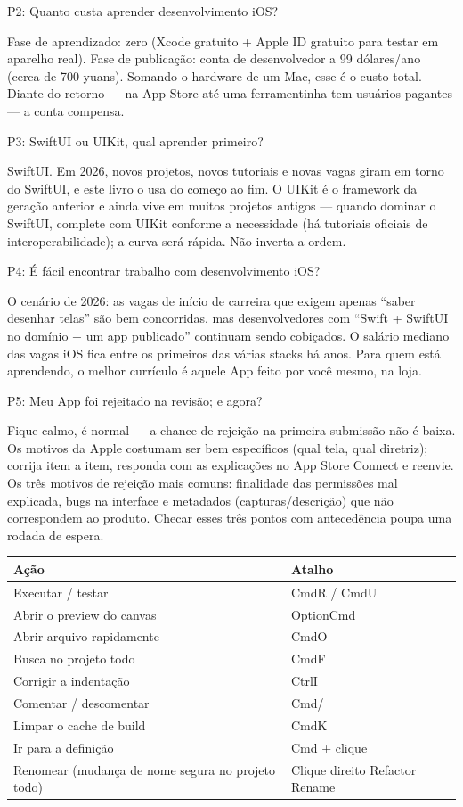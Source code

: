 P2: Quanto custa aprender desenvolvimento iOS?

Fase de aprendizado: zero (Xcode gratuito + Apple ID gratuito para testar em aparelho real). Fase de publicação: conta de desenvolvedor a 99 dólares/ano (cerca de 700 yuans). Somando o hardware de um Mac, esse é o custo total. Diante do retorno — na App Store até uma ferramentinha tem usuários pagantes — a conta compensa.

P3: SwiftUI ou UIKit, qual aprender primeiro?

SwiftUI. Em 2026, novos projetos, novos tutoriais e novas vagas giram em torno do SwiftUI, e este livro o usa do começo ao fim. O UIKit é o framework da geração anterior e ainda vive em muitos projetos antigos — quando dominar o SwiftUI, complete com UIKit conforme a necessidade (há tutoriais oficiais de interoperabilidade); a curva será rápida. Não inverta a ordem.

P4: É fácil encontrar trabalho com desenvolvimento iOS?

O cenário de 2026: as vagas de início de carreira que exigem apenas “saber desenhar telas” são bem concorridas, mas desenvolvedores com “Swift + SwiftUI no domínio + um app publicado” continuam sendo cobiçados. O salário mediano das vagas iOS fica entre os primeiros das várias stacks há anos. Para quem está aprendendo, o melhor currículo é aquele App feito por você mesmo, na loja.

P5: Meu App foi rejeitado na revisão; e agora?

Fique calmo, é normal — a chance de rejeição na primeira submissão não é baixa. Os motivos da Apple costumam ser bem específicos (qual tela, qual diretriz); corrija item a item, responda com as explicações no App Store Connect e reenvie. Os três motivos de rejeição mais comuns: finalidade das permissões mal explicada, bugs na interface e metadados (capturas/descrição) que não correspondem ao produto. Checar esses três pontos com antecedência poupa uma rodada de espera.


\begin{center}
\begin{tabularx}{\linewidth}{|X|X|}
\hline
\textbf{Ação} & \textbf{Atalho} \tabularnewline
\hline
Executar / testar & CmdR / CmdU \tabularnewline
Abrir o preview do canvas & OptionCmd \tabularnewline
Abrir arquivo rapidamente & CmdO \tabularnewline
Busca no projeto todo & CmdF \tabularnewline
Corrigir a indentação & CtrlI \tabularnewline
Comentar / descomentar & Cmd/ \tabularnewline
Limpar o cache de build & CmdK \tabularnewline
Ir para a definição & Cmd + clique \tabularnewline
Renomear (mudança de nome segura no projeto todo) & Clique direito Refactor Rename \tabularnewline
\hline
\end{tabularx}
\end{center}

